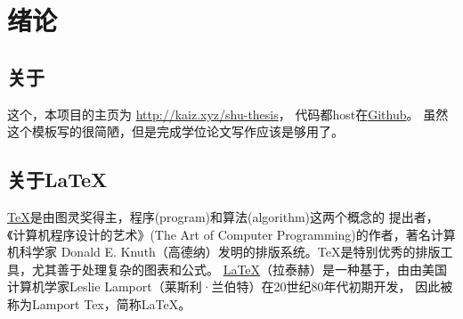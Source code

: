 \documentclass[UTF8]{ctexart}
\numberwithin{equation}{section} %
\numberwithin{table}{section} %
\begin{document}
\linespread{1.6} \selectfont  %

 
\setcounter{page}{7}  %

{\hypersetup{linkcolor=black}
\tableofcontents}

\pagebreak
\section{绪论}
\setcounter{page}{1}
\subsection{关于}
这个，本项目的主页为 \url{http://kaiz.xyz/shu-thesis}，
代码都host在\href{https://github.com/zeakey/shu-thesis}{Github}。
%
虽然这个模板写的很简陋，但是完成学位论文写作应该是够用了。

\subsection{关于\LaTeX}
\href{https://en.wikipedia.org/wiki/TeX}{\TeX}是由图灵奖得主，程序(program)和算法(algorithm)这两个概念的
提出者，《计算机程序设计的艺术》(The Art of Computer Programming)的作者，著名计算机科学家
Donald E. Knuth（高德纳）发明的排版系统。TeX是特别优秀的排版工具，尤其善于处理复杂的图表和公式。
%
\href{https://en.wikipedia.org/wiki/LaTeX}{\LaTeX}（拉泰赫）是一种基于，由由美国计算机学家Leslie Lamport（莱斯利·兰伯特）在20世纪80年代初期开发，
因此被称为Lamport Tex，简称LaTeX。
\end{document}
